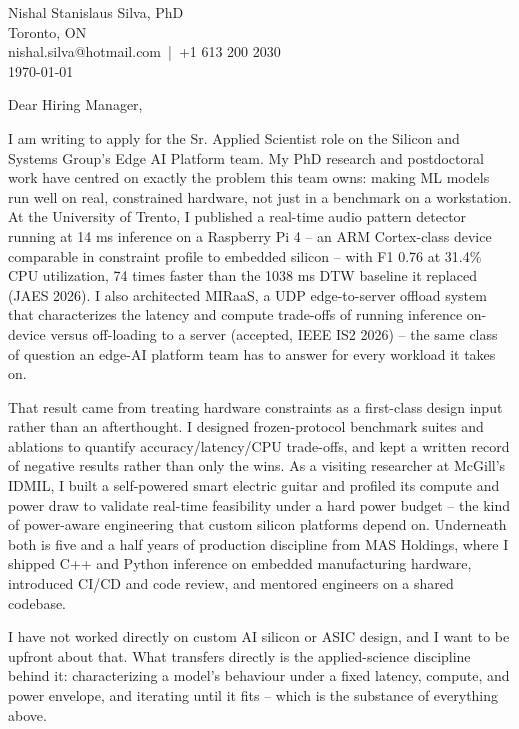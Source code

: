 \documentclass[11pt]{article}
\begin{document}
\pagestyle{empty}

\begin{flushleft}
Nishal Stanislaus Silva, PhD \\
Toronto, ON \\
nishal.silva@hotmail.com \,|\, +1 613 200 2030 \\[1em]
\today \\[1em]
\end{flushleft}

\noindent Dear Hiring Manager,

\vspace{0.5em}
\noindent I am writing to apply for the Sr. Applied Scientist role on the Silicon and Systems Group's Edge AI Platform team. My PhD research and postdoctoral work have centred on exactly the problem this team owns: making ML models run well on real, constrained hardware, not just in a benchmark on a workstation. At the University of Trento, I published a real-time audio pattern detector running at 14 ms inference on a Raspberry Pi 4 -- an ARM Cortex-class device comparable in constraint profile to embedded silicon -- with F1 0.76 at 31.4\% CPU utilization, 74 times faster than the 1038 ms DTW baseline it replaced (JAES 2026). I also architected MIRaaS, a UDP edge-to-server offload system that characterizes the latency and compute trade-offs of running inference on-device versus off-loading to a server (accepted, IEEE IS2 2026) -- the same class of question an edge-AI platform team has to answer for every workload it takes on.

\vspace{0.5em}
\noindent That result came from treating hardware constraints as a first-class design input rather than an afterthought. I designed frozen-protocol benchmark suites and ablations to quantify accuracy/latency/CPU trade-offs, and kept a written record of negative results rather than only the wins. As a visiting researcher at McGill's IDMIL, I built a self-powered smart electric guitar and profiled its compute and power draw to validate real-time feasibility under a hard power budget -- the kind of power-aware engineering that custom silicon platforms depend on. Underneath both is five and a half years of production discipline from MAS Holdings, where I shipped C++ and Python inference on embedded manufacturing hardware, introduced CI/CD and code review, and mentored engineers on a shared codebase.

\vspace{0.5em}
\noindent I have not worked directly on custom AI silicon or ASIC design, and I want to be upfront about that. What transfers directly is the applied-science discipline behind it: characterizing a model's behaviour under a fixed latency, compute, and power envelope, and iterating until it fits -- which is the substance of everything above.
\end{document}
